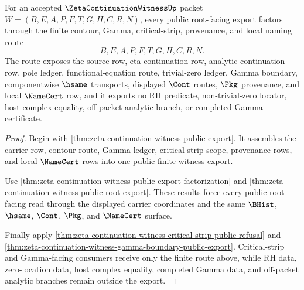 \begin{theorem}
\label{thm:zeta-continuation-witness-public-export-route}
For an accepted $\ZetaContinuationWitnessUp$ packet $W=(B,E,A,P,F,T,G,H,C,R,N)$, every public root-facing export factors through the finite contour, Gamma, critical-strip, provenance, and local naming route
$$
B,E,A,P,F,T,G,H,C,R,N.
$$
The route exposes the source row, eta-continuation row, analytic-continuation row, pole ledger, functional-equation route, trivial-zero ledger, Gamma boundary, componentwise $\hsame$ transports, displayed $\Cont$ routes, $\Pkg$ provenance, and local $\NameCert$ row, and it exports no RH predicate, non-trivial-zero locator, host complex equality, off-packet analytic branch, or completed Gamma certificate.
\end{theorem}
\begin{proof}
Begin with \autoref{thm:zeta-continuation-witness-public-export}. It assembles the carrier row, contour route, Gamma ledger, critical-strip scope, provenance rows, and local $\NameCert$ rows into one public finite witness export.

Use \autoref{thm:zeta-continuation-witness-public-export-factorization} and \autoref{thm:zeta-continuation-witness-public-root-export}. These results force every public root-facing read through the displayed carrier coordinates and the same $\BHist$, $\hsame$, $\Cont$, $\Pkg$, and $\NameCert$ surface.

Finally apply \autoref{thm:zeta-continuation-witness-critical-strip-public-refusal} and \autoref{thm:zeta-continuation-witness-gamma-boundary-public-export}. Critical-strip and Gamma-facing consumers receive only the finite route above, while RH data, zero-location data, host complex equality, completed Gamma data, and off-packet analytic branches remain outside the export.
\end{proof}

